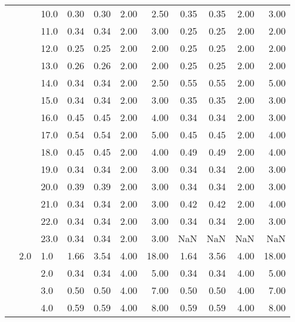 \begin{tabular}{lllrrrrrrrr}
       &     & 10.0 &       0.30 &      0.30 & 2.00 &   2.50 &       0.35 &      0.35 & 2.00 &   3.00 \\
       &     & 11.0 &       0.34 &      0.34 & 2.00 &   3.00 &       0.25 &      0.25 & 2.00 &   2.00 \\
       &     & 12.0 &       0.25 &      0.25 & 2.00 &   2.00 &       0.25 &      0.25 & 2.00 &   2.00 \\
       &     & 13.0 &       0.26 &      0.26 & 2.00 &   2.00 &       0.25 &      0.25 & 2.00 &   2.00 \\
       &     & 14.0 &       0.34 &      0.34 & 2.00 &   2.50 &       0.55 &      0.55 & 2.00 &   5.00 \\
       &     & 15.0 &       0.34 &      0.34 & 2.00 &   3.00 &       0.35 &      0.35 & 2.00 &   3.00 \\
       &     & 16.0 &       0.45 &      0.45 & 2.00 &   4.00 &       0.34 &      0.34 & 2.00 &   3.00 \\
       &     & 17.0 &       0.54 &      0.54 & 2.00 &   5.00 &       0.45 &      0.45 & 2.00 &   4.00 \\
       &     & 18.0 &       0.45 &      0.45 & 2.00 &   4.00 &       0.49 &      0.49 & 2.00 &   4.00 \\
       &     & 19.0 &       0.34 &      0.34 & 2.00 &   3.00 &       0.34 &      0.34 & 2.00 &   3.00 \\
       &     & 20.0 &       0.39 &      0.39 & 2.00 &   3.00 &       0.34 &      0.34 & 2.00 &   3.00 \\
       &     & 21.0 &       0.34 &      0.34 & 2.00 &   3.00 &       0.42 &      0.42 & 2.00 &   4.00 \\
       &     & 22.0 &       0.34 &      0.34 & 2.00 &   3.00 &       0.34 &      0.34 & 2.00 &   3.00 \\
       &     & 23.0 &       0.34 &      0.34 & 2.00 &   3.00 &        NaN &       NaN &  NaN &    NaN \\
       & 2.0 & 1.0  &       1.66 &      3.54 & 4.00 &  18.00 &       1.64 &      3.56 & 4.00 &  18.00 \\
       &     & 2.0  &       0.34 &      0.34 & 4.00 &   5.00 &       0.34 &      0.34 & 4.00 &   5.00 \\
       &     & 3.0  &       0.50 &      0.50 & 4.00 &   7.00 &       0.50 &      0.50 & 4.00 &   7.00 \\
       &     & 4.0  &       0.59 &      0.59 & 4.00 &   8.00 &       0.59 &      0.59 & 4.00 &   8.00 \\

\end{tabular}
